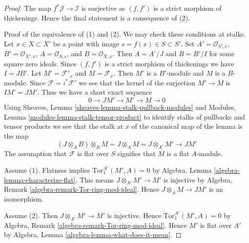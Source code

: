 \documentclass[10pt,a4paper]{amsart}
\theoremstyle{plain}
\theoremstyle{definition}
\theoremstyle{remark}
\numberwithin{equation}{subsection}
\begin{document}
\begin{proof}
The map $f^*\mathcal{J} \to \mathcal{I}$ is surjective
as $(f, f')$ is a strict morphism of thickenings.
Hence the final statement is a consequence of (2).

\medskip\noindent
Proof of the equivalence of (1) and (2). We may check these conditions
at stalks. Let $x \in X \subset X'$
be a point with image $s = f(x) \in S \subset S'$.
Set $A' = \mathcal{O}_{S', s}$, $B' = \mathcal{O}_{X', x}$,
$A = \mathcal{O}_{S, s}$, and $B = \mathcal{O}_{X, x}$.
Then $A = A'/J$ and $B = B'/I$ for some square zero ideals.
Since $(f, f')$ is a strict morphism of thickenings we have $I = JB'$.
Let $M' = \mathcal{F}'_x$ and $M = \mathcal{F}_x$.
Then $M'$ is a $B'$-module and $M$ is a $B$-module.
Since $\mathcal{F} = i^*\mathcal{F}'$ we see that the kernel of the
surjection $M' \to M$ is $IM' = JM'$. Thus we have a short exact
sequence
$$
0 \to JM' \to M' \to M \to 0
$$
Using
Sheaves, Lemma \ref{sheaves-lemma-stalk-pullback-modules}
and
Modules, Lemma \ref{modules-lemma-stalk-tensor-product}
to identify stalks of pullbacks and tensor products we see
that the stalk at $x$ of the canonical map of the lemma is the map
$$
(J \otimes_A B) \otimes_B M = J \otimes_A M = J \otimes_{A'} M'
\longrightarrow JM'
$$
The assumption that $\mathcal{F}$ is flat over $S$ signifies that
$M$ is a flat $A$-module.

\medskip\noindent
Assume (1). Flatness implies $\text{Tor}_1^{A'}(M', A) = 0$ by
Algebra, Lemma \ref{algebra-lemma-characterize-flat}.
This means $J \otimes_{A'} M' \to M'$ is injective by
Algebra, Remark \ref{algebra-remark-Tor-ring-mod-ideal}.
Hence $J \otimes_A M \to JM'$ is an isomorphism.

\medskip\noindent
Assume (2). Then $J \otimes_{A'} M' \to M'$ is injective. Hence
$\text{Tor}_1^{A'}(M', A) = 0$ by
Algebra, Remark \ref{algebra-remark-Tor-ring-mod-ideal}.
Hence $M'$ is flat over $A'$ by
Algebra, Lemma \ref{algebra-lemma-what-does-it-mean}.
\end{proof}
\end{document}

